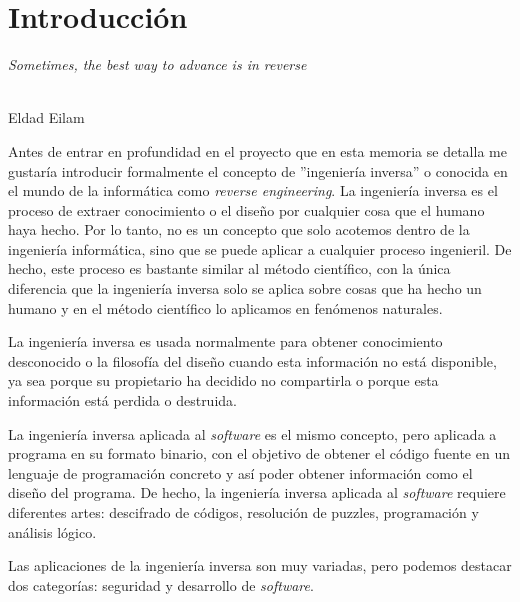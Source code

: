 \chapter{Introducción}
\label{cap:introducion}

\setcounter{page}{1}

\begin{flushright}
    \begin{minipage}[]{10cm}
        \emph{Sometimes, the best way to advance is in reverse}\\
    \end{minipage}\\

    Eldad Eilam \textit{}\\
\end{flushright}

\vspace{1cm}


Antes de entrar en profundidad en el proyecto que en esta memoria se detalla me gustaría introducir formalmente el concepto de ''ingeniería inversa'' o conocida en el mundo de la
informática como \textit{reverse engineering}. La ingeniería inversa es el proceso de extraer conocimiento o el diseño por cualquier cosa que el humano haya hecho. Por lo tanto,
no es un concepto que solo acotemos dentro de la ingeniería informática, sino que se puede aplicar a cualquier proceso ingenieril. De hecho, este proceso es bastante similar al
método científico, con la única diferencia que la ingeniería inversa solo se aplica sobre cosas que ha hecho un humano y en el método científico lo aplicamos en fenómenos
naturales.

La ingeniería inversa es usada normalmente para obtener conocimiento desconocido o la filosofía del diseño cuando esta información no está disponible, ya sea porque su propietario
ha decidido no compartirla o porque esta información está perdida o destruida. \cite{alma991003132729706711}

La ingeniería inversa aplicada al \textit{software} es el mismo concepto, pero aplicada a programa en su formato binario, con el objetivo de obtener el código fuente en un lenguaje
de programación concreto y así poder obtener información como el diseño del programa. De hecho, la ingeniería inversa aplicada al \textit{software} requiere diferentes artes:
descifrado de códigos, resolución de puzzles, programación y análisis lógico.

Las aplicaciones de la ingeniería inversa son muy variadas, pero podemos destacar dos categorías: seguridad y desarrollo de \textit{software}.

